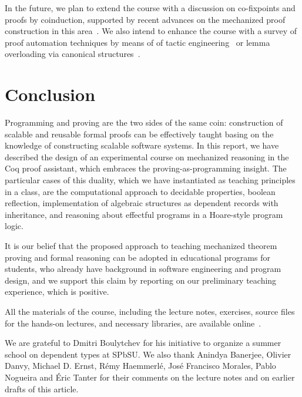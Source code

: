 \documentclass[blockstyle,preprint]{sigplanconf}
\newcommand{\todo}[1]{\textcolor{red}{({#1})}}
\begin{document}
In the future, we plan to extend the course with a discussion on
co-fixpoints and proofs by coinduction, supported by recent advances
on the mechanized proof construction in this
area~\cite{Hur-al:POPL13}. We also intend to enhance the course with a
survey of proof automation techniques by means of of tactic
engineering~\cite{Stampoulis-Shao:ICFP10,Ziliani-al:ICFP13} or lemma
overloading via canonical
structures~\cite{Gonthier-al:JFP13,Mahboubi-Tassi:ITP13}.

\section{Conclusion}
\label{sec:conclusion}

Programming and proving are the two sides of the same coin:
construction of scalable and reusable formal proofs can be effectively
taught basing on the knowledge of constructing scalable software
systems.
%
In this report, we have described the design of an experimental course
on mechanized reasoning in the Coq proof assistant, which embraces the
proving-as-programming insight.
%
The particular cases of this duality, which we have instantiated as
teaching principles in a class, are the computational approach to
decidable properties, boolean reflection, implementation of algebraic
structures as dependent records with inheritance, and reasoning about
effectful programs in a Hoare-style program logic.

It is our belief that the proposed approach to teaching mechanized
theorem proving and formal reasoning can be adopted in educational
programs for students, who already have background in software
engineering and program design, and we support this claim by reporting
on our preliminary teaching experience, which is positive.

All the materials of the course, including the lecture notes,
exercises, source files for the hands-on lectures, and necessary
libraries, are available online~\cite{Sergey:PnP}.

\acks

We are grateful to Dmitri Boulytchev for his initiative to organize a
summer school on dependent types at SPbSU. We also thank Anindya
Banerjee, Olivier Danvy, Michael D. Ernst, R\'{e}my Haemmerl\'{e},
Jos\'{e} Francisco Morales, Pablo Nogueira and \'{E}ric Tanter for
their comments on the lecture notes and on earlier drafts of this
article.



\end{document}
